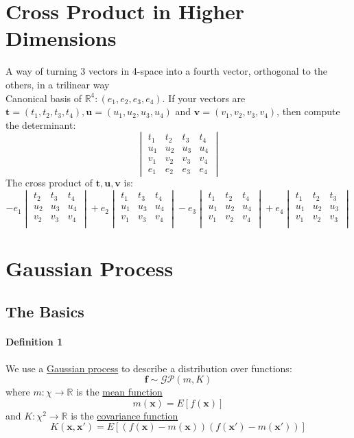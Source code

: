 \documentclass[11pt]{article}
\newcommand{\tb}[1]{\textbf{#1}}
\newcommand{\under}[1]{\underline{#1}}
\newcommand{\real}[0]{\mathbb{R}}
\newcommand{\vx}[0]{\tb{x}}
\begin{document}
	\section{Cross Product in Higher Dimensions}
	A way of turning 3 vectors in 4-space into a fourth vector, orthogonal to the others, in a trilinear way \\
	Canonical basis of $\real^4: (e_1, e_2, e_3, e_4)$. If your vectors are $\tb{t} = (t_1, t_2, t_3, t_4), \tb{u} = (u_1, u_2, u_3, u_4)$ and $\tb{v} = (v_1, v_2, v_3, v_4)$, then compute the determinant:
	$$\begin{vmatrix}
	t_1 & t_2 & t_3 & t_4 \\
	u_1 & u_2 & u_3 & u_4 \\
	v_1 & v_2 & v_3 & v_4 \\
	e_1 & e_2 & e_3 & e_4
	\end{vmatrix}$$
	The cross product of $\tb{t}, \tb{u}, \tb{v}$ is:
		$$-e_1\begin{vmatrix}
	 t_2 & t_3 & t_4 \\
	 u_2 & u_3 & u_4 \\
	 v_2 & v_3 & v_4 \\
	\end{vmatrix}
	+e_2\begin{vmatrix}
	t_1 & t_3 & t_4 \\
	u_1 & u_3 & u_4 \\
	v_1 & v_3 & v_4 \\
	\end{vmatrix}
	- e_3\begin{vmatrix}
	t_1 & t_2 & t_4 \\
	u_1 & u_2 & u_4 \\
	v_1 & v_2 & v_4 \\
	\end{vmatrix}
	+ e_4\begin{vmatrix}
	t_1 & t_2 & t_3 \\
	u_1 & u_2 & u_3 \\
	v_1 & v_2 & v_3 \\
	\end{vmatrix}
	$$
\section{Gaussian Process}
\subsection{The Basics}
\paragraph{Definition 1}
We use a \under{Gaussian process} to describe a distribution over functions:
$$\tb{f} \sim \mathcal{GP}(m, K)$$ 
where $m: \chi \rightarrow \real$ is the \under{mean function}
$$m(\vx) = E[f(\vx)]$$
and $K: \chi^2 \rightarrow \real$ is the \under{covariance function}
$$K(\vx, \vx') = E[(f(\vx) - m(\vx))(f(\vx') - m(\vx'))]$$
\end{document}
